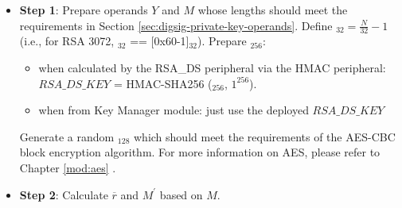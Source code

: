 \documentclass[main\_\_EN.tex]{subfiles}
\begin{document}
\begin{itemize}

    \item {\bfseries Step 1}: Prepare operands \begin{math}Y\end{math} and \begin{math}M\end{math} whose lengths should meet the requirements in Section \ref{sec:digsig-private-key-operands}. Define \begin{math}[L]_{32} = \frac{N}{32}-1 \end{math} (i.e., for RSA 3072, \begin{math}[L]_{32}\end{math} == [0x60-1]\begin{math}_{32}\end{math}). Prepare \begin{math}[RSA\_DS\_KEY]_{256}\end{math}:
    \begin{itemize}
        \item when calculated by the RSA\_DS peripheral via the HMAC peripheral: \begin{math}RSA\_DS\_KEY\end{math} = HMAC-SHA256 (\begin{math}[HMAC\_KEY]_{256}\end{math}, \begin{math}1^{256}\end{math}).
        \item when from Key Manager module: just use the deployed  \begin{math}RSA\_DS\_KEY\end{math}
    \end{itemize}
    Generate a random \begin{math}[IV]_{128}\end{math} which should meet the requirements of the AES-CBC block encryption algorithm. For more information on AES, please refer to Chapter \ref{mod:aes} \textit{}.

    \item {\bfseries Step 2}: Calculate \begin{math}\overline{r}\end{math} and \begin{math}M^{\prime} \end{math} based on \begin{math}M\end{math}.


\end{itemize}
\end{document}
